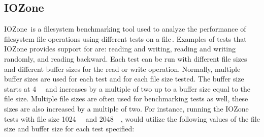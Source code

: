 \subsection{IOZone}
\label{sec:iozoneDetails}
IOZone\,\cite{IozoneFilesystemBenchmark2016} is a filesystem benchmarking tool used to analyze the performance of filesystem file operations using different tests on a file\,\cite{iozoneIozoneFilesystemBenchmark}. Examples of tests that IOZone provides support for are: reading and writing, reading and writing randomly, and reading backward. Each test can be run with different file sizes and different buffer sizes for the read or write operation. Normally, multiple buffer sizes are used for each test and for each file size tested. The buffer size starts at \SI{4}{\kilo\byte} and increases by a multiple of two up to a buffer size equal to the file size. Multiple file sizes are often used for benchmarking tests as well, these sizes are also increased by a multiple of two. For instance, running the IOZone tests with file size \SI{1024}{\kilo\byte} and \SI{2048}{\kilo\byte}, would utilize the following values of the file size and buffer size for each test specified:
